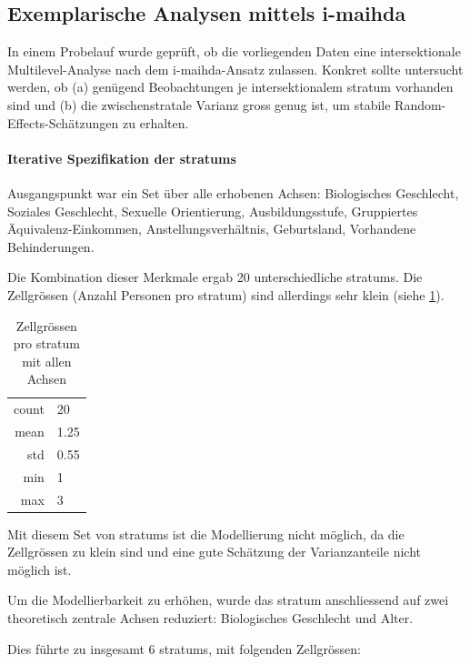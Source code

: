 \subsection*{Exemplarische Analysen mittels \gls{i-maihda}}
\label{sec:pilot_maihda}

In einem Probelauf wurde geprüft, ob die vorliegenden Daten eine intersektionale Multilevel-Analyse nach dem \gls{i-maihda}-Ansatz zulassen. Konkret sollte untersucht werden, ob (a) genügend Beobachtungen je intersektionalem \gls{stratum} vorhanden sind und (b) die zwischenstratale Varianz gross genug ist, um stabile Random-Effects-Schätzungen zu erhalten.

\paragraph{Iterative Spezifikation der \glspl{stratum}}
Ausgangspunkt war ein Set über alle erhobenen Achsen: Biologisches Geschlecht, Soziales Geschlecht, Sexuelle Orientierung, Ausbildungsstufe, Gruppiertes Äquivalenz-Einkommen, Anstellungsverhältnis, Geburtsland, Vorhandene Behinderungen.

Die Kombination dieser Merkmale ergab 20 unterschiedliche \glspl{stratum}. Die Zellgrössen (Anzahl Personen pro \gls{stratum}) sind allerdings sehr klein (siehe \cref{tab:zellgroessen_alle_achsen}).

\begin{table}[h]
    \centering
    \begin{tabular}{rl}
        count & 20 \\
        mean & 1.25 \\
        std & 0.55 \\
        min & 1 \\
        max & 3 \\
    \end{tabular}
    \caption{Zellgrössen pro \gls{stratum} mit allen Achsen}
    \label{tab:zellgroessen_alle_achsen}
\end{table}

Mit diesem Set von \glspl{stratum} ist die Modellierung nicht möglich, da die Zellgrössen zu klein sind und eine gute Schätzung der Varianzanteile nicht möglich ist.

Um die Modellierbarkeit zu erhöhen, wurde das \gls{stratum} anschliessend auf zwei theoretisch zentrale Achsen reduziert: Biologisches Geschlecht und Alter.

Dies führte zu insgesamt $6$ \glspl{stratum}, mit folgenden Zellgrössen:

